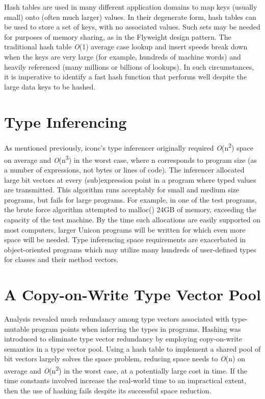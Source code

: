 Hash tables are used in many different application domains to map keys
(usually small) onto (often much larger) values. In their degenerate
form, hash tables can be used to store a set of keys, with no
associated values. Such sets may be needed for purposes of memory
sharing, as in the Flyweight design pattern. The traditional hash
table {\textit{O}}(1) average case lookup and insert speeds break down
when the keys are very large (for example, hundreds of machine words)
and heavily referenced (many millions or billions of lookups). In such
circumstances, it is imperative to identify a fast hash function that
performs well despite the large data keys to be hashed.

\section{Type Inferencing}

As mentioned previously, iconc's type inferencer originally required
\textit{O}(n\textsuperscript{2}) space on average and
\textit{O}(n\textsuperscript{3}) in the worst case, where n
corresponds to program size (as a number of expressions, not bytes or
lines of code).  The inferencer allocated large bit vectors at every
(sub)expression point in a program where typed values are
transmitted. This algorithm runs acceptably for small and medium size
programs, but fails for large programs. For example, in one of the
test programs, the brute force algorithm attempted to
\textsf{malloc()} 24GB of memory, exceeding the capacity of the test
machine. By the time such allocations are easily supported on most
computers, larger Unicon programs will be written for which even more
space will be needed. Type inferencing
space requirements are exacerbated in object-oriented programs which
may utilize many hundreds of user-defined types for classes and their
method vectors.

\section{A Copy-on-Write Type Vector Pool}

Analysis revealed much redundancy among type vectors associated with
type-mutable program points when inferring the types in
programs. Hashing was introduced to eliminate type vector redundancy
by employing copy-on-write semantics in a type vector pool. Using a
hash table to implement a shared pool of bit vectors largely solves
the space problem, reducing space needs to \textit{O}(n) on average
and \textit{O}(n\textsuperscript{2}) in the worst case, at a
potentially large cost in time. If the time constants involved
increase the real-world time to an impractical extent, then the use of
hashing fails despite its successful space reduction.

